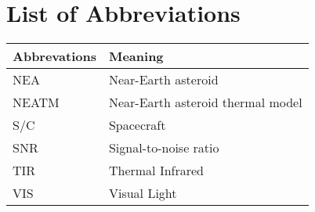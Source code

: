 \chapter*{List of Abbreviations}

\begin{table}[h]
\centering
\begin{tabular}{l|l}
\textbf{Abbrevations} & \textbf{Meaning}                  \\ \hline
NEA                   & Near-Earth asteroid               \\
NEATM                 & Near-Earth asteroid thermal model \\
S/C                   & Spacecraft                        \\
SNR                   & Signal-to-noise ratio             \\
TIR                   & Thermal Infrared                  \\
VIS                   & Visual Light                     
\end{tabular}
\end{table}
